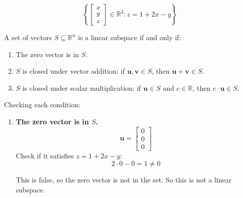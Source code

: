 \[
\left\{
\begin{bmatrix}
x \\ y \\ z
\end{bmatrix}
\in \mathbb{R}^3 : z = 1 + 2x - y
\right\}
\]

A set of vectors \( S \subseteq \mathbb{R}^n \) is a linear subspace if and only if:
\begin{enumerate}
    \item The zero vector is in \( S \).
    \item \( S \) is closed under vector addition: if \( \mathbf{u}, \mathbf{v} \in S \), then \( \mathbf{u} + \mathbf{v} \in S \).
    \item \( S \) is closed under scalar multiplication: if \( \mathbf{u} \in S \) and \( c \in \mathbb{R} \), then \( c \cdot \mathbf{u} \in S \).
\end{enumerate}


Checking each condition:
\begin{enumerate}
    \item \textbf{The zero vector is in \( S \).}
    \[
    \mathbf{u} = 
    \begin{bmatrix} 
    0 \\ 0 \\ 0
    \end{bmatrix}
    \]
    Check if it satisfies \( z = 1 + 2x - y \): 
    \[
    2 \cdot 0 - 0 = 1 \neq 0
    \]

This is false, so the zero vector is not in the set.
So this is not a linear subspace.
\end{enumerate}